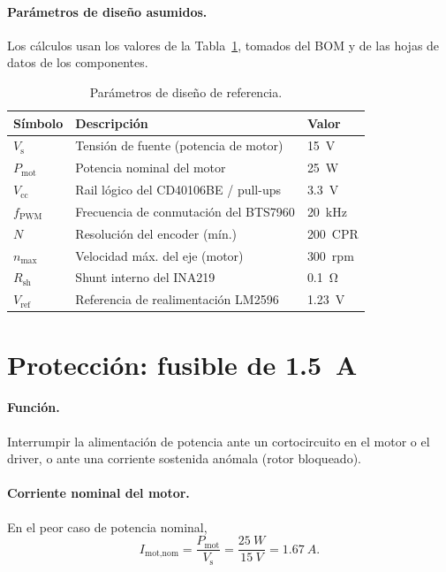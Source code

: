 \documentclass[11pt,letterpaper]{article}
\begin{document}
\paragraph{Parámetros de diseño asumidos.}
Los cálculos usan los valores de la Tabla~\ref{tab:param}, tomados del BOM y de
las hojas de datos de los componentes.

\begin{table}[H]
  \centering
  \caption{Parámetros de diseño de referencia.}
  \label{tab:param}
  \begin{tabular}{lll}
    \toprule
    Símbolo & Descripción & Valor \\
    \midrule
    $V_\text{s}$        & Tensión de fuente (potencia de motor) & \SI{15}{V} \\
    $P_\text{mot}$      & Potencia nominal del motor            & \SI{25}{W} \\
    $V_\text{cc}$       & Rail lógico del CD40106BE / pull-ups  & \SI{3.3}{V} \\
    $f_\text{PWM}$      & Frecuencia de conmutación del BTS7960 & \SI{20}{kHz} \\
    $N$                 & Resolución del encoder (mín.)         & \SI{200}{CPR} \\
    $n_\text{max}$      & Velocidad máx. del eje (motor)        & \SI{300}{rpm} \\
    $R_\text{sh}$       & Shunt interno del INA219              & \SI{0.1}{\ohm} \\
    $V_\text{ref}$      & Referencia de realimentación LM2596   & \SI{1.23}{V} \\
    \bottomrule
  \end{tabular}
\end{table}

\section{Protección: fusible de \texorpdfstring{\SI{1.5}{A}}{1.5 A}}
\paragraph{Función.} Interrumpir la alimentación de potencia ante un cortocircuito
en el motor o el driver, o ante una corriente sostenida anómala (rotor bloqueado).

\paragraph{Corriente nominal del motor.} En el peor caso de potencia nominal,
\begin{equation}
  I_\text{mot,nom} = \frac{P_\text{mot}}{V_\text{s}}
  = \frac{\SI{25}{W}}{\SI{15}{V}} = \SI{1.67}{A}.
  \label{eq:imot}
\end{equation}
\end{document}
